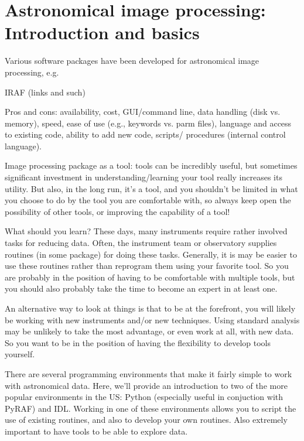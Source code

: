 \documentclass{article}
\begin{document}
\section{Astronomical image processing: Introduction and basics}

Various software packages have been developed for astronomical image processing,
e.g.\
\begin{itemize*}
    \item IRAF (links and such)
\end{itemize*}
Pros and cons: availability, cost, GUI/command line, data handling
(disk vs. memory), speed, ease of use (e.g., keywords vs. parm files),
language and access to existing code, ability to add new code,
scripts/ procedures (internal control language).

Image processing package as a tool: tools can be incredibly useful,
but sometimes significant investment in understanding/learning your
tool really increases its utility. But also, in the long run, it's a
tool, and you shouldn't be limited in what you choose to do by the
tool you are comfortable with, so always keep open the possibility of
other tools, or improving the capability of a tool!

What should you learn? These days, many instruments require rather
involved tasks for reducing data. Often, the instrument team or
observatory supplies routines (in some package) for doing these tasks.
Generally, it is may be easier to use these routines rather than
reprogram them using your favorite tool. So you are probably in the
position of having to be comfortable with multiple tools, but you
should also probably take the time to become an expert in at least
one.

An alternative way to look at things is that to be at the forefront,
you will likely be working
with new instruments and/or new techniques. Using standard analysis
may be unlikely to take the most advantage, or even work at all, with
new data. So you want to be in the position of having the flexibility
to develop tools yourself.

There are several programming environments that make it fairly simple
to work with astronomical data. Here, we'll provide an introduction to
two of the more popular environments in the US: Python (especially
useful in conjuction with PyRAF) and IDL. Working in one of these
environments allows you to script the use of existing routines, and
also to develop your own routines. Also extremely important to have
tools to be able to explore data.
\end{document}
